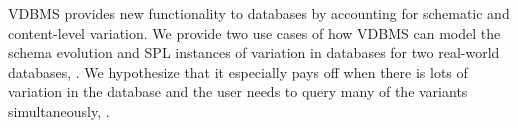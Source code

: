 VDBMS provides new functionality to databases by accounting for 
schematic and content-level variation. We provide two use cases of how VDBMS can
model the schema evolution and SPL instances of variation in databases
for two real-world databases,
. 
We hypothesize that it especially pays
off when there is lots of variation in the database and the user needs to query
many of the variants simultaneously, . 



